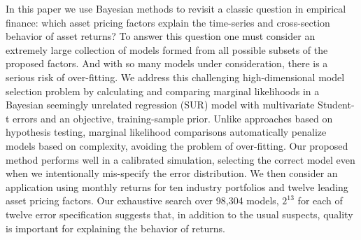 In this paper we use Bayesian methods to revisit a classic question in empirical finance: which asset pricing factors explain the time-series and cross-section behavior of asset returns? 
To answer this question one must consider an extremely large collection of models formed from all possible subsets of the proposed factors.
And with so many models under consideration, there is a serious risk of over-fitting.
We address this challenging high-dimensional model selection problem by calculating and comparing marginal likelihoods in a Bayesian seemingly unrelated regression (SUR) model with multivariate Student-t errors and an objective, training-sample prior.
Unlike approaches based on hypothesis testing, marginal likelihood comparisons automatically penalize models based on complexity, avoiding the problem of over-fitting. 
Our proposed method performs well in a calibrated simulation, selecting the correct model even when we intentionally mis-specify the error distribution.
We then consider an application using monthly returns for ten industry portfolios and twelve leading asset pricing factors.
Our exhaustive search over  98,304 models, $2^{13}$ for each of twelve error specification suggests that, in addition to the usual suspects, quality is important for explaining the behavior of returns.

